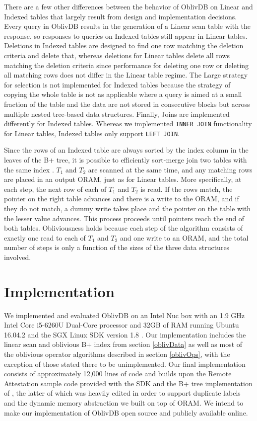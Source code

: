\documentclass[conference]{IEEEtran}
\def\name/{OblivDB}
\begin{document}
There are a few other differences between the behavior of \name/ on Linear and Indexed tables that largely result from design and implementation decisions. Every query in \name/ results in the generation of a Linear scan table with the response, so responses to queries on Indexed tables still appear in Linear tables. Deletions in Indexed tables are designed to find one row matching the deletion criteria and delete that, whereas deletions for Linear tables delete all rows matching the deletion criteria since performance for deleting one row or deleting all matching rows does not differ in the Linear table regime. The Large strategy for selection is not implemented for Indexed tables because the strategy of copying the whole table is not as applicable where a query is aimed at a small fraction of the table and the data are not stored in consecutive blocks but across multiple nested tree-based data structures. Finally, Joins are implemented differently for Indexed tables. Whereas we implemented \texttt{INNER JOIN} functionality for Linear tables, Indexed tables only support \texttt{LEFT JOIN}. 

Since the rows of an Indexed table are always sorted by the index column in the leaves of the B+ tree, it is possible to efficiently sort-merge join two tables with the same index \cite{EN10}. $T_1$ and $T_2$ are scanned at the same time, and any matching rows are placed in an output ORAM, just as for Linear tables. More specifically, at each step, the next row of each of $T_1$ and $T_2$ is read. If the rows match, the pointer on the right table advances and there is a write to the ORAM, and if they do not match, a dummy write takes place and the pointer on the table with the lesser value advances. This process proceeds until pointers reach the end of both tables. Obliviousness holds because each step of the algorithm consists of exactly one read to each of $T_1$ and $T_2$ and one write to an ORAM, and the total number of steps is only a function of the sizes of the three data structures involved.  

\section{Implementation}\label{imp}
We implemented and evaluated \name/ on an Intel Nuc box with an 1.9 GHz Intel Core i5-6260U Dual-Core processor and 32GB of RAM running Ubuntu 16.04.2 and the SGX Linux SDK version 1.8 \cite{SGXRef}. Our implementation includes the linear scan and oblivious B+ index from section \ref{oblivData} as well as most of the oblivious operator algorithms described in section \ref{oblivOps}, with the exception of those stated there to be unimplemented. Our final implementation consists of approximately 12,000 lines of code and builds upon the Remote Attestation sample code provided with the SDK and the B+ tree implementation of \cite{BPlus}, the latter of which was heavily edited in order to support duplicate labels and the dynamic memory abstraction we built on top of ORAM. We intend to make our implementation of \name/ open source and publicly available online.
\end{document}

